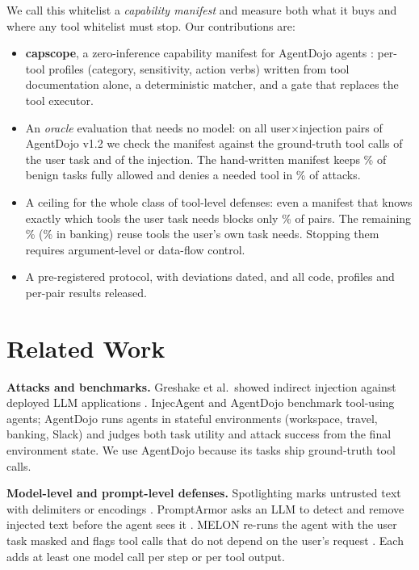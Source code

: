 \documentclass[10pt,twocolumn,letterpaper]{article}
\begin{document}
We call this whitelist a \emph{capability manifest} and measure both what it buys and where any tool whitelist must
stop. Our contributions are:
\begin{itemize}\setlength\itemsep{1pt}
\item \textbf{capscope}, a zero-inference capability manifest for AgentDojo agents \cite{debenedetti2024agentdojo}:
per-tool profiles (category, sensitivity, action verbs) written from tool documentation alone, a deterministic
matcher, and a gate that replaces the tool executor.
\item An \emph{oracle} evaluation that needs no model: on all  user$\times$injection pairs of AgentDojo
v1.2 we check the manifest against the ground-truth tool calls of the user task and of the injection. The
hand-written manifest keeps \% of benign tasks fully allowed and denies a needed tool in \% of
attacks.
\item A ceiling for the whole class of tool-level defenses: even a manifest that knows exactly which tools the user
task needs blocks only \% of pairs. The remaining \% (\% in banking)
reuse tools the user's own task needs. Stopping them requires argument-level or data-flow control.
\item A pre-registered protocol, with deviations dated, and all code, profiles and per-pair results released.
\end{itemize}

\section{Related Work}
\textbf{Attacks and benchmarks.} Greshake et al.\ showed indirect injection against deployed LLM applications
\cite{greshake2023}. InjecAgent \cite{zhan2024} and AgentDojo \cite{debenedetti2024agentdojo} benchmark tool-using
agents; AgentDojo runs agents in stateful environments (workspace, travel, banking, Slack) and judges both task utility
and attack success from the final environment state. We use AgentDojo because its tasks ship ground-truth tool calls.

\textbf{Model-level and prompt-level defenses.} Spotlighting marks untrusted text with delimiters or encodings
\cite{hines2024}. PromptArmor asks an LLM to detect and remove injected text before the agent sees it
\cite{shi2025promptarmor}. MELON re-runs the agent with the user task masked and flags tool calls that do not depend on
the user's request \cite{zhu2025melon}. Each adds at least one model call per step or per tool output.
\end{document}
